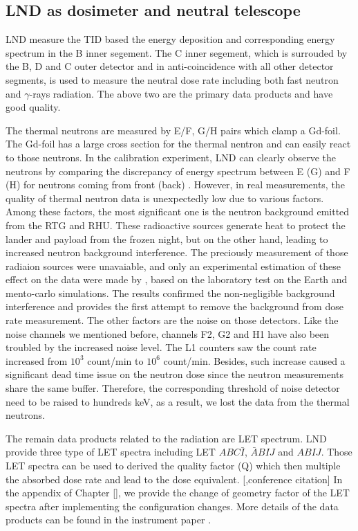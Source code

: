 \subsection{LND as dosimeter and neutral telescope}

\ac{LND} measure the \ac{TID} based the energy deposition and corresponding energy spectrum in the B inner segement. The C inner segement, which is surrouded by the B, D and C outer detector and in anti-coincidence with
all other detector segments, is used to measure the neutral dose rate including both fast neutron and $\gamma$-rays radiation. The above two are the primary data products and have good quality. 

The thermal neutrons are measured by E/F, G/H pairs which clamp a Gd-foil. The Gd-foil has a large cross section for the thermal nentron and can easily react to those neutrons. In the calibration experiment, \ac{LND} can clearly observe the neutrons by comparing the discrepancy of energy spectrum between E (G) and F (H) for neutrons coming from front (back) \citet{Wimmer2020SSRv}.
However, in real measurements, the quality of thermal neutron data is unexpectedly low due to various factors. Among these factors, the most significant one is the neutron background emitted from the \ac{RTG} and \ac{RHU}. These radioactive sources generate heat to protect the lander and payload from the frozen night, but on the other hand, leading to increased neutron background interference. The preciously measurement of those radiaion sources were unavaiable, and only an experimental estimation of these effect on the data were made by \citep{Hou2020-LNDbackground}, based on the laboratory test on the Earth and mento-carlo simulations. The results  confirmed the non-negligible background interference and provides the first attempt to remove the background from dose rate measurement. The other factors are the noise on those detectors. Like the noise channels we mentioned before, channels F2, G2 and H1 have also been troubled by the increased noise level. The L1 counters saw the count rate increased from $10^3$ count/min to $10^6$ count/min. Besides, such increase caused a significant dead time issue on the neutron dose since the neutron measurements share the same buffer. Therefore, the corresponding threshold of noise detector need to be raised to hundreds keV, as a result, we lost the data from the thermal neutrons.

The remain data products related to the radiation are \ac{LET} spectrum. \ac{LND} provide three type of \ac{LET} spectra including \ac{LET} $ABC\bar{I}$, $\bar{A}BIJ$ and $ABIJ$. Those \ac{LET} spectra can be used to derived the quality factor (Q) which then multiple the absorbed dose rate and lead to the dose equivalent. [,conference citation]
In the appendix of Chapter [], we provide the change of geometry factor of the LET spectra after implementing the configuration changes.
More details of the data products can be found in the instrument paper \citet{Wimmer2020SSRv}.

